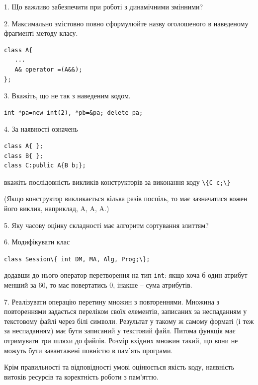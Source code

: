 \documentclass[12pt, ukrainian]{article}
\def\code#1{\Verb!#1!}
\begin{document}
{%
1. Що важливо забезпечити при роботі з динамічними змінними?%
\par
\vspace{2mm}
2. Максимально змістовно повно сформулюйте назву оголошеного в наведеному фрагменті методу класу.
\vspace{-3mm}
\begin{verbatim}class A{
   ...
   A& operator =(A&&);
};\end{verbatim}
\vspace{-3mm}
\par
\vspace{2mm}
3. Вкажіть, що не так з наведеним кодом.
\vspace{-3mm}
\begin{verbatim}int *pa=new int(2), *pb=&pa; delete pa;\end{verbatim}
\vspace{-3mm}
\par
\vspace{2mm}
4. За наявності означень
\vspace{-3mm}
\begin{verbatim}
class A{ };
class B{ };
class C:public A{B b;};\end{verbatim}
\vspace{-3mm}
вкажіть послідовність викликів конструкторів за виконання коду \code{\{C c;\}} 

(Якщо конструктор викликається кілька разів поспіль, то має зазначатися кожен його виклик, наприклад, A, A, A.)

\vspace{2mm}
5. Яку часову оцінку складності має алгоритм сортування злиттям?
\par
\vspace{2mm}
6. Модифікувати клас 

\qquad\code{class Session\{ int DM, MA, Alg, Prog;\};} 


додавши до нього оператор перетворення на тип \code{int}: якщо хоча б один атрибут менший за 60, то має повертатись 0, інакше -- сума атрибутів.%
\par
\vspace{2mm}
7. 
Реалізувати операцію перетину множин з повтореннями. Множина з повтореннями задається переліком своїх елементів, записаних за неспаданням у текстовому файлі через білі символи. Результат у такому ж самому форматі (і теж за неспаданням) має бути записаний у текстовий файл. Питома функція має отримувати три шляхи до файлів. Розмір вхідних множин такий, що вони не можуть бути завантажені повністю в пам’ять програми.

Крім правильності та відповідності умові оцінюється якість коду, наявність витоків ресурсів та коректність роботи з пам'яттю. 

}
\end{document}

